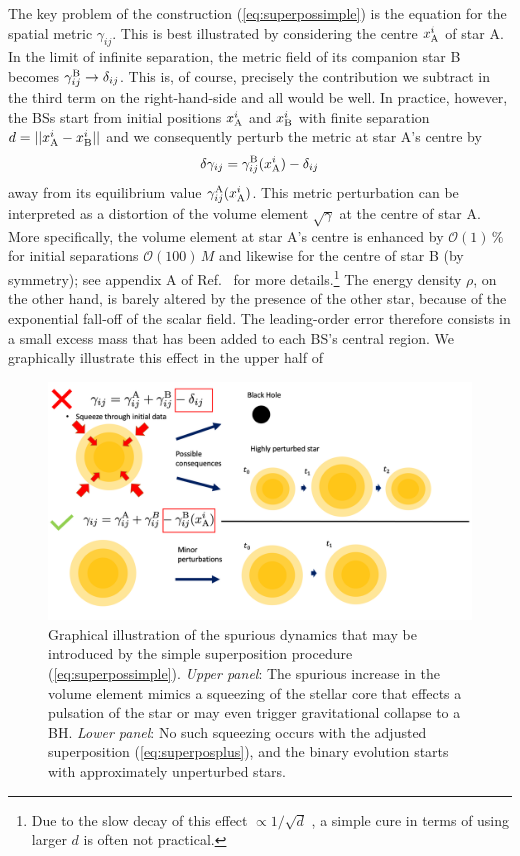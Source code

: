 \documentclass[]{iopart}
\begin{document}
The key problem of the construction (\ref{eq:superpossimple}) is
the equation for the spatial metric $\gamma_{ij}$. This is best
illustrated by considering the centre $x_{\rm A}^i$ of star A.  In
the limit of infinite separation, the metric field of its companion
star B becomes $\gamma_{ij}^{\rm B}\rightarrow \delta_{ij}$.  This
is, of course, precisely the contribution we subtract in the third
term on the right-hand-side and all would be well.  In practice,
however, the BSs start from initial positions $x_{\rm A}^i$ and
$x_{\rm B}^i$ with finite separation $d=||x_{\rm A}^i-x_{\rm B}^i||$
and we consequently perturb the metric at star A's centre by
%
\begin{equation}
  \delta \gamma_{ij} = \gamma_{ij}^{\rm B}(x^i_{\rm A})
  -\delta_{ij}
  \label{eq:metricpert}
\end{equation}
%
away from its equilibrium value $\gamma_{ij}^{\rm A}(x_{\rm A}^i)$.
This metric perturbation can be interpreted as a distortion of the
volume element $\sqrt{\gamma}$ at the centre of star A. More
specifically, the volume element at star A's centre is enhanced by
$\mathcal{O}(1)\,\%$ for initial separations $\mathcal{O}(100)\,M$
and likewise for the centre of star B (by symmetry); see appendix
A of Ref.~\cite{Helfer:2018vtq} for more details.\footnote{Due to
the slow decay of this effect $\propto 1/\sqrt{d}$ \cite{Helfer:2018vtq},
a simple cure in terms of using larger $d$ is often not practical.}
The energy density $\rho$, on the other hand, is barely altered by
the presence of the other star, because of the exponential fall-off
of the scalar field. The leading-order error therefore consists in
a small excess mass that has been added to each BS's central region.
We graphically illustrate this effect in the upper half of
%
\begin{figure}[t]
    \centering
    \includegraphics[width=350pt]{BosonStarTrick.png}
    \caption{
    Graphical illustration of the spurious dynamics that may be
    introduced by the simple superposition procedure
    (\ref{eq:superpossimple}). {\it Upper panel}: The spurious
    increase in the volume element mimics a squeezing of the stellar
    core that effects a pulsation of the star or may even trigger
    gravitational collapse to a BH.  {\it Lower panel}: No such
    squeezing occurs with the adjusted superposition
    (\ref{eq:superposplus}), and the binary evolution starts with
    approximately unperturbed stars.
    }
    \label{fig:Overview}
\end{figure}
\end{document}
